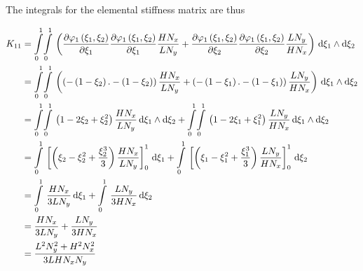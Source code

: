 The integrals for the elemental stiffness matrix are thus

\begin{equation}
  \begin{aligned}
    K_{11}&=\giint{0}{1}{0}{1}{\pbrac{\delby{\lbfn{1}{\xi_{1},\xi_{2}}}{\xi_{1}}\delby{\lbfn{1}{\xi_{1},\xi_{2}}}{\xi_{1}}
        \dfrac{H N_{x}}{L N_{y}}+\delby{\lbfn{1}{\xi_{1},\xi_{2}}}{\xi_{2}}\delby{\lbfn{1}{\xi_{1},\xi_{2}}}{\xi_{2}}
        \dfrac{L N_{y}}{H N_{x}}}}{\xi_{1}}{\xi_{2}}\\
    &=\giint{0}{1}{0}{1}{\pbrac{\pbrac{-\pbrac{1-\xi_{2}}.-\pbrac{1-\xi_{2}}}\dfrac{H N_{x}}{L N_{y}}+
    \pbrac{-\pbrac{1-\xi_{1}}.-\pbrac{1-\xi_{1}}}\dfrac{L N_{y}}{H N_{x}}}}{\xi_{1}}{\xi_{2}} \\
    &=\giint{0}{1}{0}{1}{\pbrac{1-2\xi_{2}+\xi_{2}^{2}}\dfrac{H N_{x}}{L N_{y}}}{\xi_{1}}{\xi_{2}}+
    \giint{0}{1}{0}{1}{\pbrac{1-2\xi_{1}+\xi_{1}^{2}}\dfrac{L N_{y}}{H N_{x}}}{\xi_{1}}{\xi_{2}} \\
    &=\gint{0}{1}{\sqbrac{\pbrac{\xi_{2}-\xi_{2}^{2}+\dfrac{\xi_{2}^{3}}{3}}\dfrac{H N_{x}}{L N_{y}}}_{0}^{1}}{\xi_{1}}+
    \gint{0}{1}{\sqbrac{\pbrac{\xi_{1}-\xi_{1}^{2}+\dfrac{\xi_{1}^{3}}{3}}\dfrac{L N_{y}}{H N_{x}}}_{0}^{1}}{\xi_{2}} \\
    &=\gint{0}{1}{\dfrac{H N_{x}}{3 L N_{y}}}{\xi_{1}}+\gint{0}{1}{\dfrac{L N_{y}}{3 H N_{x}}}{\xi_{2}} \\
    &=\dfrac{H N_{x}}{3 L N_{y}}+\dfrac{L N_{y}}{3 H N_{x}} \\
    &=\dfrac{L^{2}N_{y}^{2}+H^{2}N_{x}^{2}}{3 L H N_{x} N_{y}}
  \end{aligned}
\end{equation}

